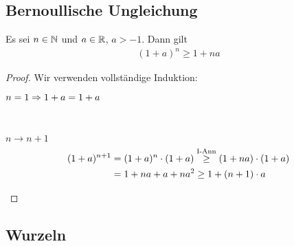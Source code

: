 \vfill

\subsection{Bernoullische Ungleichung}

\begin{satz}
    \label{satz:bernoulli-ungleichung}
    Es sei $n\in\mathbb{N}$ und $a\in\mathbb{R}$, $a > -1$. Dann gilt
    \begin{align*}
    (1+a)
        ^n \geq 1+na
    \end{align*}
    \begin{proof}
        Wir verwenden vollständige Induktion:\\
        \begin{induktionsanfang}
            $n=1 \Rightarrow{} 1+a = 1+a$
        \end{induktionsanfang}
        \\
        \begin{induktionsschritt}
            $n\rightarrow n+1$
            \begin{align*}
            (1+a)
                ^{n+1} &= (1+a)^n\cdot (1+a) \overset{\text{I-Ann}}{\geq} (1+na)\cdot(1+a) \\
                &= 1+na+a+na^2\geq 1+(n+1)\cdot a\qedhere
            \end{align*}
        \end{induktionsschritt}
    \end{proof}
\end{satz}

\vfill


\newpage

\subsection{Wurzeln}

